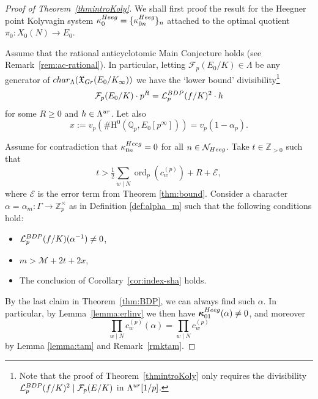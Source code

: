 \documentclass[10pt,reqno]{amsart}
\numberwithin{equation}{section}
\theoremstyle{plain}
\theoremstyle{definition}
\theoremstyle{definition}
\theoremstyle{plain}
\theoremstyle{plain}
\theoremstyle{plain}
\theoremstyle{plain}
\theoremstyle{plain}
\theoremstyle{plain}
\DeclareMathOperator{\ord}{ord}
\newcommand{\al}{\alpha} %
\newcommand{\Z}{\mathbb{Z}}
\newcommand{\Q}{\mathbb{Q}}
\newcommand{\bkappa}{\boldsymbol{\kappa}}
\newcommand{\CE}{\mathcal{E}}
\newcommand{\CM}{\mathcal{M}}
\newcommand{\Lcal}{\mathcal{L}}
\newcommand{\Fcal}{\mathcal{F}}
\newcommand{\rH}{\mathrm{H}}
\begin{document}
\begin{proof}[Proof of Theorem~\ref{thmintroKoly}]

We shall first proof the result for the Heegner point Kolyvagin system $\kappa_0^{\rm Heeg}=\{\kappa_{0n}^{\rm Heeg}\}_n$ attached to the optimal quotient $\pi_0:X_0(N)\rightarrow E_0$.

Assume that the rational anticyclotomic Main Conjecture  
holds (see Remark~\ref{rem:ac-rational}). In particular, letting $\Fcal_p(E_0/K)\in\Lambda$ be any generator of ${\rm char}_\Lambda(\mathfrak{X}_{\rm Gr}(E_0/K_\infty))$ we have the `lower bound' divisibility\footnote{Note 
that the proof of Theorem~\ref{thmintroKoly} only requires the divisibility $\Lcal_p^{\rm BDP}(f/K)^2\mid\Fcal_p(E/K)$ in $\Lambda^{\rm ur}[1/p]$.}
\begin{equation}\label{eq:rational-div}
\Fcal_p(E_0/K)\cdot p^R=\Lcal_p^{\rm BDP}(f/K)^2\cdot h
\end{equation}
for some $R\geq 0$ and $h\in\Lambda^{\rm ur}$. Let also
$$x:= v_p(\#\rH^0(\Q_p,E_0[p^\infty]))= v_p(1-\alpha_p).$$ 

Assume for contradiction that
 $\kappa_{0n}^{\rm Heeg}=0$ for all $n\in\mathcal{N}_{\rm Heeg}$. Take $t\in \Z_{>0}$ such that
\begin{equation}\label{eq:t}
t> \tfrac{1}{2}\sum_{w\mid N}\ord_p(c_w^{(p)}) +R+ \CE,
\end{equation}
where $\CE$ is the error term from Theorem \ref{thm:bound}. Consider a  character $\alpha=\alpha_{m}: \Gamma \to \Z_p^{\times}$ as in 
Definition \ref{def:alpha_m}
such that the following conditions hold:
\begin{itemize}
\item[(a)] $\Lcal_p^{\rm BDP}(f/K)(\al^{-1})\neq 0$, 
\item[(b)] $m> \CM + 2t+2x$,
\item[(c)] The conclusion of Corollary~\ref{cor:index-sha} holds.
\end{itemize}
By the last claim in Theorem~\ref{thm:BDP}, %
we can always find such $\alpha$. In particular, by Lemma~\ref{lemma:erlinv} we then have $\bkappa_{01}^{\rm Heeg}(\alpha)\neq 0$, and moreover  
\[
\prod_{w\mid N}c_w^{(p)}(\alpha) = \prod_{w\mid N} c_w^{(p)}
\]
by Lemma \ref{lemma:tam} and Remark~\ref{rmktam}.


\end{proof}
\end{document}
